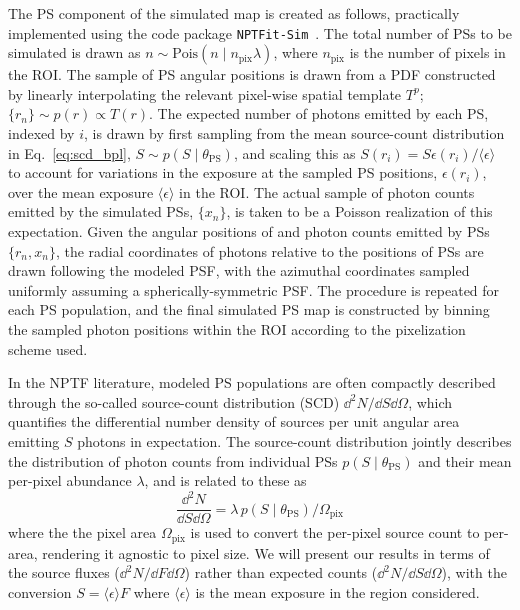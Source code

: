 \documentclass[prd,aps,10pt,nofootinbib,twocolumn,superscriptaddress,preprintnumbers,balancelastpage,longbibliography]{revtex4-1}
\begin{document}
The PS component of the simulated \Fermi map is created as follows, practically implemented using the code package \texttt{NPTFit-Sim}~\cite{NPTFit-Sim}. The total number of PSs to be simulated is drawn as $n \sim \mathrm{Pois}(n\mid n_\mathrm{pix}\lambda)$, where $n_\mathrm{pix}$ is the number of pixels in the ROI. The sample of PS angular positions is drawn from a PDF constructed by linearly interpolating the relevant pixel-wise spatial template $T^p$; $\{r_n\} \sim p(r) \propto T(r)$. The expected number of photons emitted by each PS, indexed by $i$, is drawn by first sampling from the mean source-count distribution in Eq.~\eqref{eq:scd_bpl}, $S \sim p\left({S}\mid\theta_\mathrm{PS}\right)$, and scaling this as ${S(r_i)} = S \epsilon(r_i) / \langle \epsilon \rangle$ to account for variations in the \Fermi exposure at the sampled PS positions, $\epsilon(r_i)$, over the mean exposure $\langle \epsilon \rangle$ in the ROI. The actual sample of photon counts emitted by the simulated PSs, $\{x_n\}$, is taken to be a Poisson realization of this expectation. Given the angular positions of and photon counts emitted by PSs $\{r_n, x_n\}$, the radial coordinates of photons relative to the positions of PSs are drawn following the modeled \Fermi PSF, with the azimuthal coordinates sampled uniformly assuming a spherically-symmetric PSF. The procedure is repeated for each PS population, and the final simulated PS map is constructed by binning the sampled photon positions within the ROI according to the pixelization scheme used.

In the NPTF literature, modeled PS populations are often compactly described through the so-called source-count distribution (SCD) $\dd^2 N /\dd S \dd\Omega$, which quantifies the differential number density of sources per unit angular area emitting $S$ photons in expectation. The source-count distribution jointly describes the distribution of photon counts from individual PSs $p(S\mid\theta_\mathrm{PS})$ and their mean per-pixel abundance $\lambda$, and is related to these as
\begin{equation}
\label{eq:scd_ps}
\frac{\dd^2 N}{\dd S\dd\Omega}=\lambda \, p(S\mid\theta_\mathrm{PS}) / \Omega_\mathrm{pix}
\end{equation}
where the the pixel area $\Omega_\mathrm{pix}$ is used to convert the per-pixel source count to per-area, rendering it agnostic to pixel size. We will present our results in terms of the source fluxes ($\dd^2 N /\dd F\dd\Omega$) rather than expected counts ($\dd^2 N /\dd S\dd\Omega$), with the conversion $S = \langle \epsilon \rangle F$ where $\langle \epsilon \rangle$ is the mean exposure in the region considered. 
\end{document}
